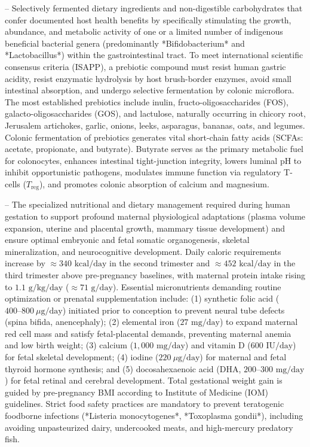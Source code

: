 -- Selectively fermented dietary ingredients and non-digestible carbohydrates that confer documented host health benefits by specifically stimulating the growth, abundance, and metabolic activity of one or a limited number of indigenous beneficial bacterial genera (predominantly *Bifidobacterium* and *Lactobacillus*) within the gastrointestinal tract. To meet international scientific consensus criteria (ISAPP), a prebiotic compound must resist human gastric acidity, resist enzymatic hydrolysis by host brush-border enzymes, avoid small intestinal absorption, and undergo selective fermentation by colonic microflora. The most established prebiotics include inulin, fructo-oligosaccharides (FOS), galacto-oligosaccharides (GOS), and lactulose, naturally occurring in chicory root, Jerusalem artichokes, garlic, onions, leeks, asparagus, bananas, oats, and legumes. Colonic fermentation of prebiotics generates vital short-chain fatty acids (SCFAs: acetate, propionate, and butyrate). Butyrate serves as the primary metabolic fuel for colonocytes, enhances intestinal tight-junction integrity, lowers luminal pH to inhibit opportunistic pathogens, modulates immune function via regulatory T-cells ($T_{\text{reg}}$), and promotes colonic absorption of calcium and magnesium.

-- The specialized nutritional and dietary management required during human gestation to support profound maternal physiological adaptations (plasma volume expansion, uterine and placental growth, mammary tissue development) and ensure optimal embryonic and fetal somatic organogenesis, skeletal mineralization, and neurocognitive development. Daily caloric requirements increase by $\approx 340\text{ kcal/day}$ in the second trimester and $\approx 452\text{ kcal/day}$ in the third trimester above pre-pregnancy baselines, with maternal protein intake rising to $1.1\text{ g/kg/day}$ ($\approx 71\text{ g/day}$). Essential micronutrients demanding routine optimization or prenatal supplementation include: (1) synthetic folic acid ($400\text{--}800\ \mu\text{g/day}$) initiated prior to conception to prevent neural tube defects (spina bifida, anencephaly); (2) elemental iron ($27\text{ mg/day}$) to expand maternal red cell mass and satisfy fetal-placental demands, preventing maternal anemia and low birth weight; (3) calcium ($1{,}000\text{ mg/day}$) and vitamin D ($600\text{ IU/day}$) for fetal skeletal development; (4) iodine ($220\ \mu\text{g/day}$) for maternal and fetal thyroid hormone synthesis; and (5) docosahexaenoic acid (DHA, $200\text{--}300\text{ mg/day}$) for fetal retinal and cerebral development. Total gestational weight gain is guided by pre-pregnancy BMI according to Institute of Medicine (IOM) guidelines. Strict food safety practices are mandatory to prevent teratogenic foodborne infections (*Listeria monocytogenes*, *Toxoplasma gondii*), including avoiding unpasteurized dairy, undercooked meats, and high-mercury predatory fish.

